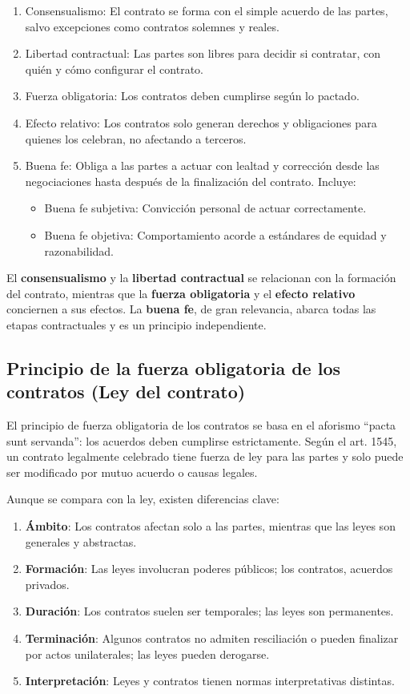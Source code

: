 \documentclass{templateNote}
\begin{document}
\begin{enumerate}
    \item Consensualismo: El contrato se forma con el simple acuerdo de las partes, salvo excepciones como contratos solemnes y reales.
    \item Libertad contractual: Las partes son libres para decidir si contratar, con quién y cómo configurar el contrato.
    \item Fuerza obligatoria: Los contratos deben cumplirse según lo pactado.
    \item Efecto relativo: Los contratos solo generan derechos y obligaciones para quienes los celebran, no afectando a terceros.
    \item Buena fe: Obliga a las partes a actuar con lealtad y corrección desde las negociaciones hasta después de la finalización del contrato. Incluye:
    \begin{itemize}
        \item Buena fe subjetiva: Convicción personal de actuar correctamente.
        \item Buena fe objetiva: Comportamiento acorde a estándares de equidad y razonabilidad.
    \end{itemize}
\end{enumerate}

El \textbf{consensualismo} y la \textbf{libertad contractual} se relacionan con la formación del contrato, mientras que la \textbf{fuerza obligatoria} y el \textbf{efecto relativo} conciernen a sus efectos. La \textbf{buena fe}, de gran relevancia, abarca todas las etapas contractuales y es un principio independiente.

\subsection{Principio de la fuerza obligatoria de los contratos (Ley del contrato)}
El principio de fuerza obligatoria de los contratos se basa en el aforismo ``pacta sunt servanda'': los acuerdos deben cumplirse estrictamente. Según el art. 1545, un contrato legalmente celebrado tiene fuerza de ley para las partes y solo puede ser modificado por mutuo acuerdo o causas legales.

\noindent Aunque se compara con la ley, existen diferencias clave:

\begin{enumerate}
    \item \textbf{Ámbito}: Los contratos afectan solo a las partes, mientras que las leyes son generales y abstractas.
    \item \textbf{Formación}: Las leyes involucran poderes públicos; los contratos, acuerdos privados.
    \item \textbf{Duración}: Los contratos suelen ser temporales; las leyes son permanentes.
    \item \textbf{Terminación}: Algunos contratos no admiten resciliación o pueden finalizar por actos unilaterales; las leyes pueden derogarse.
    \item \textbf{Interpretación}: Leyes y contratos tienen normas interpretativas distintas.
\end{enumerate}
\end{document}

